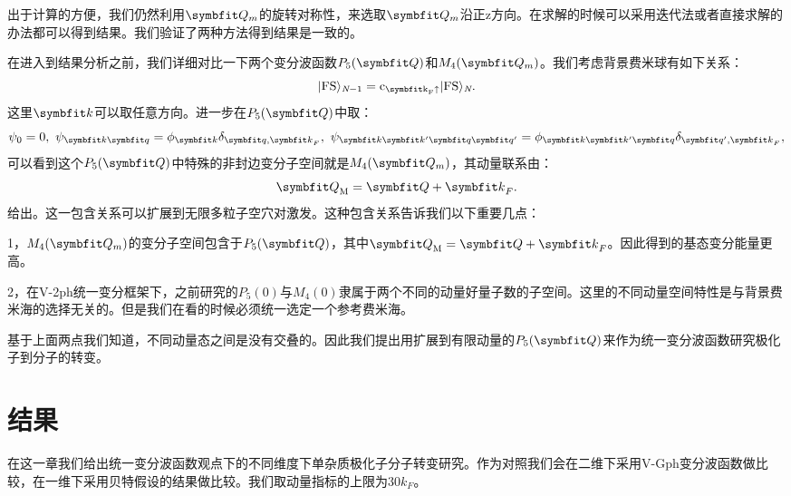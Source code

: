 出于计算的方便，我们仍然利用$\Vector{Q}_m$的旋转对称性，来选取$\Vector{Q}_m$沿正z方向。在求解的时候可以采用迭代法或者直接求解的办法都可以得到结果。我们验证了两种方法得到结果是一致的。

在进入到结果分析之前，我们详细对比一下两个变分波函数$P_5(\Vector{Q})$和$M_4(\Vector{Q}_m)$。我们考虑背景费米球有如下关系：
\begin{equation}
|\rm FS\rangle_{\textit{N}-1}=c_{{\Vector{k} }_F \uparrow}|\rm FS\rangle_\textit{N}. \label{relation}
\end{equation}
这里$\Vector{k}$可以取任意方向。进一步在$P_5(\Vector{Q})$中取：
\begin{equation}
\psi_0=0, \ \psi_{{\Vector{k} }  {\Vector{q} } }=\phi_{\Vector{k} }\delta_{{\Vector{q} },{\Vector{k} }_F},\ \psi_{{\Vector{k} }{\Vector{k'} }  {\Vector{q} }{\Vector{q'} }}=\phi_{{\Vector{k} }{\Vector{k'} }  {\Vector{q} } }\delta_{{\Vector{q'} },{\Vector{k} }_F}, \label{corr1}
\end{equation}
可以看到这个$P_5(\Vector{Q})$中特殊的非封边变分子空间就是$M_4(\Vector{Q}_m)$，其动量联系由：
\begin{equation}
{\Vector{Q} }_{\rm M}={\Vector{Q} }+{\Vector{k} }_F.  \label{corr2}
\end{equation}
给出。这一包含关系可以扩展到无限多粒子空穴对激发。这种包含关系告诉我们以下重要几点：

1，$M_4(\Vector{Q}_m)$的变分子空间包含于$P_5(\Vector{Q})$，其中${\Vector{Q} }_{\rm M}={\Vector{Q} }+{\Vector{k} }_F$。因此得到的基态变分能量更高。

2，在V-2ph统一变分框架下，之前研究的$P_5(0)$与$M_4(0)$隶属于两个不同的动量好量子数的子空间。这里的不同动量空间特性是与背景费米海的选择无关的。但是我们在看的时候必须统一选定一个参考费米海。

基于上面两点我们知道，不同动量态之间是没有交叠的。因此我们提出用扩展到有限动量的$P_5(\Vector{Q})$来作为统一变分波函数研究极化子到分子的转变。

\section{结果}\label{3sec:result}
在这一章我们给出统一变分波函数观点下的不同维度下单杂质极化子分子转变研究。作为对照我们会在二维下采用V-Gph变分波函数做比较，在一维下采用贝特假设的结果做比较。我们取动量指标的上限为$30k_F$。

